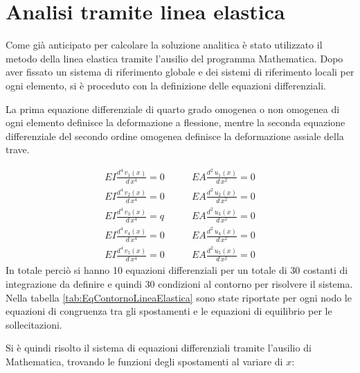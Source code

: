 \pagebreak
{}
\section{Analisi tramite linea elastica}
Come già anticipato per calcolare la soluzione analitica è stato utilizzato il metodo della linea elastica tramite l'ausilio del programma Mathematica.
Dopo aver fissato un sistema di riferimento globale e dei sistemi di riferimento locali per ogni elemento, si è proceduto con la definizione delle equazioni differenziali. 

La prima equazione differenziale di quarto grado omogenea o non omogenea di ogni elemento definisce la deformazione a flessione, mentre la seconda equazione differenziale del secondo ordine omogenea definisce la deformazione assiale della trave.

{\footnotesize{
\begin{align*}
    EI\frac{d^4\,v_1(x)}{d\,x^4} = 0 &\qquad
    EA\frac{d^2\,u_1(x)}{d\,x^2} = 0 \\
    EI\frac{d^4\,v_2(x)}{d\,x^4} = 0 &\qquad
    EA\frac{d^2\,u_2(x)}{d\,x^2} = 0 \\
    EI\frac{d^4\,v_3(x)}{d\,x^4} = q &\qquad
    EA\frac{d^2\,u_3(x)}{d\,x^2} = 0 \\
    EI\frac{d^4\,v_4(x)}{d\,x^4} = 0 &\qquad
    EA\frac{d^2\,u_4(x)}{d\,x^2} = 0 \\
    EI\frac{d^4\,v_5(x)}{d\,x^4} = 0 &\qquad
    EA\frac{d^2\,u_5(x)}{d\,x^2} = 0 
\end{align*}}}
In totale perciò si hanno 10 equazioni differenziali per un totale di 30 costanti di integrazione da definire e quindi 30 condizioni al contorno per risolvere il sistema.
Nella tabella \ref{tab:EqContornoLineaElastica} sono state riportate per ogni nodo le equazioni di congruenza tra gli spostamenti e le equazioni di equilibrio per le sollecitazioni.


Si è quindi risolto il sistema di equazioni differenziali tramite l'ausilio di Mathematica, trovando le funzioni degli spostamenti al variare di $x$:

